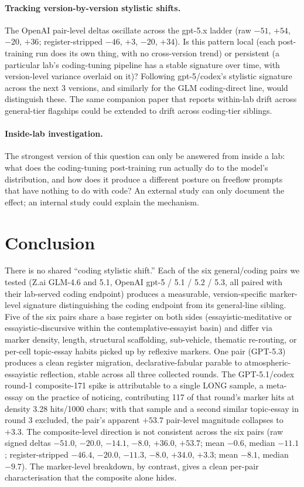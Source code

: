 \documentclass[11pt,a4paper]{article}
\begin{document}
\paragraph{Tracking version-by-version stylistic shifts.} The OpenAI pair-level deltas oscillate across the gpt-5.x ladder (raw $-51$, $+54$, $-20$, $+36$; register-stripped $-46$, $+3$, $-20$, $+34$). Is this pattern local (each post-training run does its own thing, with no cross-version trend) or persistent (a particular lab's coding-tuning pipeline has a stable signature over time, with version-level variance overlaid on it)? Following gpt-5/codex's stylistic signature across the next 3 versions, and similarly for the GLM coding-direct line, would distinguish these. The same companion paper that reports within-lab drift across general-tier flagships \citep{tenner2026drift} could be extended to drift across coding-tier siblings.

\paragraph{Inside-lab investigation.} The strongest version of this question can only be answered from inside a lab: what does the coding-tuning post-training run actually do to the model's distribution, and how does it produce a different posture on freeflow prompts that have nothing to do with code? An external study can only document the effect; an internal study could explain the mechanism.

\section{Conclusion}
\label{sec:conclusion}

There is no shared ``coding stylistic shift.'' Each of the six general/coding pairs we tested (Z.ai GLM-4.6 and 5.1, OpenAI gpt-5 / 5.1 / 5.2 / 5.3, all paired with their lab-served coding endpoint) produces a measurable, version-specific marker-level signature distinguishing the coding endpoint from its general-line sibling. Five of the six pairs share a base register on both sides (essayistic-meditative or essayistic-discursive within the contemplative-essayist basin) and differ via marker density, length, structural scaffolding, sub-vehicle, thematic re-routing, or per-cell topic-essay habits picked up by reflexive markers. One pair (GPT-5.3) produces a clean register migration, declarative-fabular parable to atmospheric-essayistic reflection, stable across all three collected rounds. The GPT-5.1/codex round-1 composite-171 spike is attributable to a single LONG sample, a meta-essay on the practice of noticing, contributing 117 of that round's marker hits at density 3.28 hits/1000 chars; with that sample and a second similar topic-essay in round 3 excluded, the pair's apparent $+53.7$ pair-level magnitude collapses to $+3.3$. The composite-level direction is not consistent across the six pairs (raw signed deltas $-51.0$, $-20.0$, $-14.1$, $-8.0$, $+36.0$, $+53.7$; mean $-0.6$, median $-11.1$; register-stripped $-46.4$, $-20.0$, $-11.3$, $-8.0$, $+34.0$, $+3.3$; mean $-8.1$, median $-9.7$). The marker-level breakdown, by contrast, gives a clean per-pair characterisation that the composite alone hides.
\end{document}
